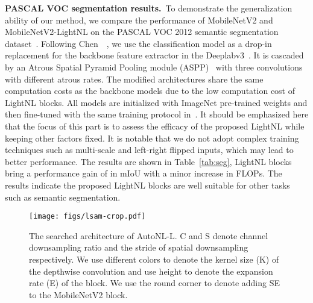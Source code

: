 \documentclass[10pt,twocolumn,letterpaper]{article}
\begin{document}
\vspace{0.5ex}\noindent\textbf{PASCAL VOC segmentation results.}~To demonstrate the generalization ability of our method, we compare the performance of MobileNetV2 and MobileNetV2-LightNL on the PASCAL VOC 2012 semantic segmentation dataset~\cite{everingham2015pascal}.
Following Chen~\etal~\cite{chen2019renas}, we use the classification model as a drop-in replacement for the backbone feature extractor in the Deeplabv3~\cite{chen2017rethinking}. It is cascaded by an Atrous Spatial Pyramid Pooling module (ASPP)~\cite{chen2017deeplab} with three  convolutions with different atrous rates. The modified architectures share the same computation costs as the backbone models due to the low computation cost of LightNL blocks. All models are initialized with ImageNet pre-trained weights and then fine-tuned with the same training protocol in~\cite{chen2017deeplab}. 
It should be emphasized here that the focus of this part is to assess the efficacy of the proposed LightNL while keeping other factors fixed. It is notable that we do not adopt complex training techniques such as multi-scale and left-right flipped inputs, which may lead to better performance. The results are shown in Table~\ref{tab:seg}, LightNL blocks bring a performance gain of  in mIoU with a minor increase in FLOPs.
The results indicate the proposed LightNL blocks are well suitable for other tasks such as semantic segmentation.

\begin{figure*}[tb]
    \centering
    \texttt{[image: figs/lsam-crop.pdf]}
    \caption{The searched architecture of AutoNL-L. C and S denote channel downsampling ratio and the stride of spatial downsampling respectively. We use different colors to denote the kernel size (K) of the depthwise convolution and use height to denote the expansion rate (E) of the block. We use the round corner to denote adding SE~\cite{hu2018se} to the MobileNetV2 block.}
    \label{fig:atomnas_m_arch}
    \vspace{-1.5em}
\end{figure*}
\end{document}
